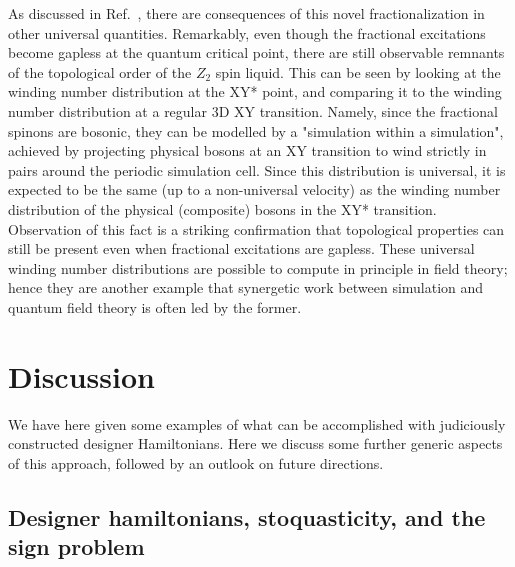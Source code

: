 \documentclass[range]{ar2e}
\begin{document}
As discussed in Ref.~\cite{XYstarQMC}, there are consequences of this novel fractionalization in other universal quantities.  Remarkably, even though the fractional excitations become gapless at the quantum critical point, there are still observable remnants of the topological order of the $Z_2$ spin liquid.  This can be seen by looking at the winding number distribution at the XY* point, and comparing it to the winding number distribution at a regular 3D XY transition.  Namely, since the fractional spinons are bosonic, they can be modelled by a "simulation within a simulation", achieved by projecting physical bosons at an XY transition to wind strictly in pairs around the periodic simulation cell.  Since this distribution is universal, it is expected to be the same (up to a non-universal velocity) as the winding number distribution of the physical (composite) bosons in the XY* transition.  Observation of this fact \cite{XYstarQMC} is a striking confirmation that topological properties can still be present even when fractional excitations are gapless.  These universal winding number distributions are possible to compute in principle in field theory; hence they are another example that synergetic work between simulation and quantum field theory is often led by the former.



\section{Discussion}
\label{sec:discussion}

We have here given some examples of what can be accomplished with judiciously constructed designer Hamiltonians. Here we discuss
some further generic aspects of this approach, followed by an outlook on future directions.

\subsection{Designer hamiltonians, stoquasticity, and the sign problem}
\end{document}
